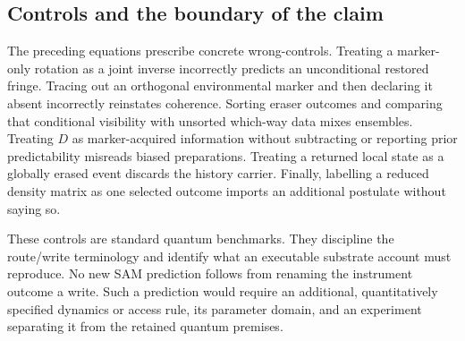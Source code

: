 \subsection{Controls and the boundary of the claim}
The preceding equations prescribe concrete wrong-controls. Treating a marker-only rotation as a joint inverse incorrectly predicts an unconditional restored fringe. Tracing out an orthogonal environmental marker and then declaring it absent incorrectly reinstates coherence. Sorting eraser outcomes and comparing that conditional visibility with unsorted which-way data mixes ensembles. Treating $D$ as marker-acquired information without subtracting or reporting prior predictability misreads biased preparations. Treating a returned local state as a globally erased event discards the history carrier. Finally, labelling a reduced density matrix as one selected outcome imports an additional postulate without saying so.

These controls are standard quantum benchmarks. They discipline the route/write terminology and identify what an executable substrate account must reproduce. No new SAM prediction follows from renaming the instrument outcome a write. Such a prediction would require an additional, quantitatively specified dynamics or access rule, its parameter domain, and an experiment separating it from the retained quantum premises.

